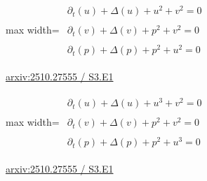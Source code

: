 \documentclass[10pt,a4paper]{article}
\begin{document}
\begin{minipage}{\linewidth}
\begin{center}\begin{adjustbox}{max width=\linewidth}$\displaystyle\begin{gathered}\begin{gathered}\partial_{t}(u)+\Delta(u)+u^{2}+v^{2}=0\end{gathered}\\[5pt]\begin{gathered}\partial_{t}(v)+\Delta(v)+p^{2}+v^{2}=0\end{gathered}\\[5pt]\begin{gathered}\partial_{t}(p)+\Delta(p)+p^{2}+u^{2}=0\end{gathered}\end{gathered}$\end{adjustbox}\end{center}
{\small \href{https://arxiv.org/html/2510.27555#S3.E1}{arxiv:2510.27555 / S3.E1}}\par
\end{minipage}\par\vspace{7mm}

\begin{minipage}{\linewidth}
\begin{center}\begin{adjustbox}{max width=\linewidth}$\displaystyle\begin{gathered}\begin{gathered}\partial_{t}(u)+\Delta(u)+u^{3}+v^{2}=0\end{gathered}\\[5pt]\begin{gathered}\partial_{t}(v)+\Delta(v)+p^{2}+v^{2}=0\end{gathered}\\[5pt]\begin{gathered}\partial_{t}(p)+\Delta(p)+p^{2}+u^{3}=0\end{gathered}\end{gathered}$\end{adjustbox}\end{center}
{\small \href{https://arxiv.org/html/2510.27555#S3.E1}{arxiv:2510.27555 / S3.E1}}\par
\end{minipage}\par\vspace{7mm}
\end{document}
